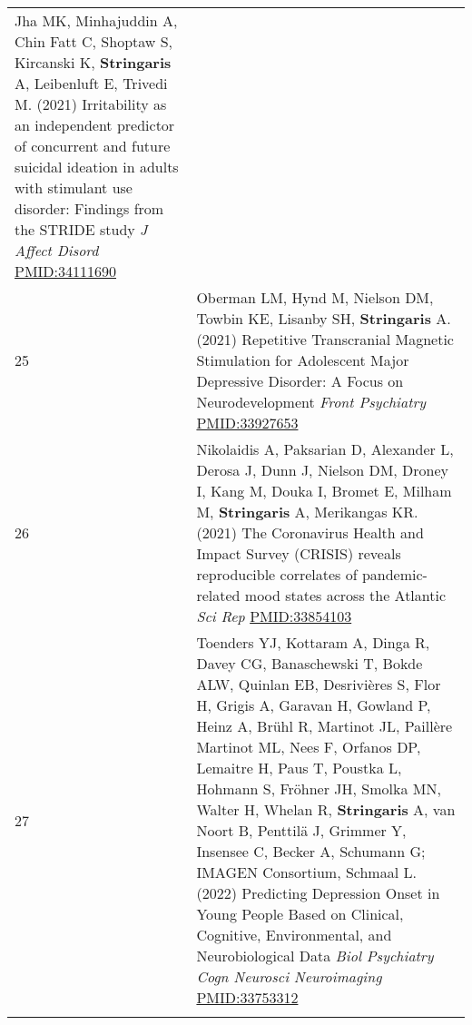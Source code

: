 \documentclass[
]{article}
\begin{document}
\begin{longtable}[]{@{}ll@{}}
\begin{minipage}[t]{0.94\columnwidth}
Jha MK, Minhajuddin A, Chin Fatt C, Shoptaw S, Kircanski K,
\textbf{Stringaris} A, Leibenluft E, Trivedi M. (2021) Irritability as
an independent predictor of concurrent and future suicidal ideation in
adults with stimulant use disorder: Findings from the STRIDE study
\emph{J Affect Disord} \url{PMID:34111690}\strut
\end{minipage}\tabularnewline
\begin{minipage}[t]{0.01\columnwidth}\raggedright
25\strut
\end{minipage} & \begin{minipage}[t]{0.94\columnwidth}\raggedright
Oberman LM, Hynd M, Nielson DM, Towbin KE, Lisanby SH,
\textbf{Stringaris} A. (2021) Repetitive Transcranial Magnetic
Stimulation for Adolescent Major Depressive Disorder: A Focus on
Neurodevelopment \emph{Front Psychiatry} \url{PMID:33927653}\strut
\end{minipage}\tabularnewline
\begin{minipage}[t]{0.01\columnwidth}\raggedright
26\strut
\end{minipage} & \begin{minipage}[t]{0.94\columnwidth}\raggedright
Nikolaidis A, Paksarian D, Alexander L, Derosa J, Dunn J, Nielson DM,
Droney I, Kang M, Douka I, Bromet E, Milham M, \textbf{Stringaris} A,
Merikangas KR. (2021) The Coronavirus Health and Impact Survey (CRISIS)
reveals reproducible correlates of pandemic-related mood states across
the Atlantic \emph{Sci Rep} \url{PMID:33854103}\strut
\end{minipage}\tabularnewline
\begin{minipage}[t]{0.01\columnwidth}\raggedright
27\strut
\end{minipage} & \begin{minipage}[t]{0.94\columnwidth}\raggedright
Toenders YJ, Kottaram A, Dinga R, Davey CG, Banaschewski T, Bokde ALW,
Quinlan EB, Desrivières S, Flor H, Grigis A, Garavan H, Gowland P, Heinz
A, Brühl R, Martinot JL, Paillère Martinot ML, Nees F, Orfanos DP,
Lemaitre H, Paus T, Poustka L, Hohmann S, Fröhner JH, Smolka MN, Walter
H, Whelan R, \textbf{Stringaris} A, van Noort B, Penttilä J, Grimmer Y,
Insensee C, Becker A, Schumann G; IMAGEN Consortium, Schmaal L. (2022)
Predicting Depression Onset in Young People Based on Clinical,
Cognitive, Environmental, and Neurobiological Data \emph{Biol Psychiatry
Cogn Neurosci Neuroimaging} \url{PMID:33753312}\strut
\end{minipage}\tabularnewline
\begin{minipage}[t]{0.01\columnwidth}\raggedright

\end{minipage}
\end{longtable}
\end{document}
